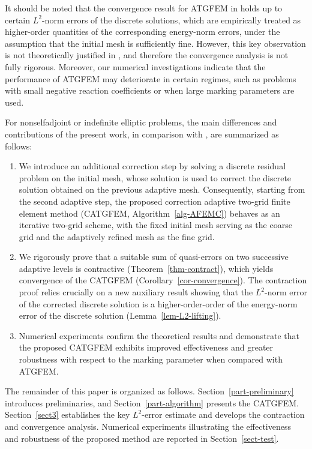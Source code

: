 \documentclass[preprint,times]{elsarticle}%
\numberwithin{algorithm}{section}
\numberwithin{equation}{section}
\begin{document}
It should be noted that the convergence result for ATGFEM in \cite{LiYkZhangY21:A908} holds up to certain $L^2$-norm errors of the discrete solutions, which are empirically treated as higher-order quantities of the corresponding energy-norm errors, under the assumption that the initial mesh is sufficiently fine. However, this key observation is not theoretically justified in \cite{LiYkZhangY21:A908}, and therefore the convergence analysis is not fully rigorous. Moreover, our numerical investigations indicate that the performance of ATGFEM may deteriorate in certain regimes, such as problems with small negative reaction coefficients or when large marking parameters are used.

For nonselfadjoint or indefinite elliptic problems, the main differences and contributions of the present work, in comparison with \cite{LiYkZhangY21:A908}, are summarized as follows:
\begin{enumerate}
\item We introduce an additional correction step by solving a discrete residual problem on the initial mesh, whose solution is used to correct the discrete solution obtained on the previous adaptive mesh. Consequently, starting from the second adaptive step, the proposed correction adaptive two-grid finite element method (CATGFEM, Algorithm~\ref{alg-AFEMC}) behaves as an iterative two-grid scheme, with the fixed initial mesh serving as the coarse grid and the adaptively refined mesh as the fine grid.
\item We rigorously prove that a suitable sum of quasi-errors on two successive adaptive levels is contractive (Theorem~\ref{thm-contract}), which yields convergence of the CATGFEM (Corollary~\ref{cor-convergence}). The contraction proof relies crucially on a new auxiliary result showing that the $L^2$-norm error of the corrected discrete solution is a higher-order-order of the energy-norm error of the discrete solution (Lemma~\ref{lem-L2-lifting}).
\item Numerical experiments confirm the theoretical results and demonstrate that the proposed CATGFEM exhibits improved effectiveness and greater robustness with respect to the marking parameter when compared with ATGFEM.
\end{enumerate}
The remainder of this paper is organized as follows. Section~\ref{part-preliminary} introduces preliminaries, and Section~\ref{part-algorithm} presents the CATGFEM. Section~\ref{sect3} establishes the key $L^2$-error estimate and develops the contraction and convergence analysis. Numerical experiments illustrating the effectiveness and robustness of the proposed method are reported in Section~\ref{sect-test}.
\end{document}

